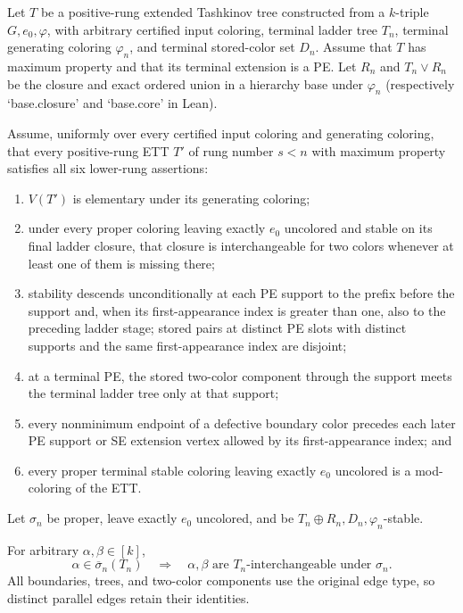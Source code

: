 \begin{lemma}
Let $T$ be a positive-rung extended Tashkinov tree constructed from a
$k$-triple $G,e_0,\varphi$, with arbitrary certified input coloring,
terminal ladder tree $T_n$, terminal generating coloring $\varphi_n$,
and terminal stored-color set $D_n$.  Assume that $T$ has maximum
property and that its terminal extension is a PE.  Let $R_n$ and
$T_n\vee R_n$ be the closure and exact ordered union in a hierarchy
base under $\varphi_n$ (respectively `base.closure' and `base.core'
in Lean).

Assume, uniformly over every certified input coloring and generating
coloring, that every positive-rung ETT $T'$ of rung number $s<n$ with
maximum property satisfies all six lower-rung assertions:
\begin{enumerate}
\item $V(T')$ is elementary under its generating coloring;
\item under every proper coloring leaving exactly $e_0$ uncolored and
stable on its final ladder closure, that closure is interchangeable for
two colors whenever at least one of them is missing there;
\item stability descends unconditionally at each PE support to the prefix before the
support and, when its first-appearance index is greater than one, also to
the preceding ladder stage; stored pairs at
distinct PE slots with distinct supports and the same first-appearance
index are disjoint;
\item at a terminal PE, the stored two-color component through the
support meets the terminal ladder tree only at that support;
\item every nonminimum endpoint of a defective boundary color precedes
each later PE support or SE extension vertex allowed by its
first-appearance index; and
\item every proper terminal stable coloring leaving exactly $e_0$
uncolored is a mod-coloring of the ETT.
\end{enumerate}

Let $\sigma_n$ be proper, leave exactly $e_0$ uncolored, and be
$T_n\oplus R_n,D_n,\varphi_n$-stable.

For arbitrary $\alpha,\beta\in[k]$,
\[
 \alpha\in\overline\sigma_n(T_n)
 \quad\Longrightarrow\quad
 \alpha,\beta\text{ are $T_n$-interchangeable under }\sigma_n.
\]
All boundaries, trees, and two-color components use the original edge
type, so distinct parallel edges retain their identities.
\end{lemma}
